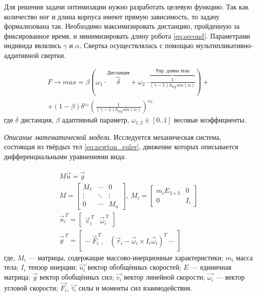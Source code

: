 Для решения задачи оптимизации нужно разработать целевую функцию. Так как количество ног и длина корпуса имеют прямую зависимость, то задачу формализована так. Необходимо максимизировать дистанцию, пройденную за фиксированное время, и минимизировать длину робота \eqref{eq:second}. Параметрами индивида являлись $\gamma$ и $\alpha$. Свертка осуществлялась с помощью мультипликативно-аддитивной свертки.

\begin{eqnarray}
    \label{eq:second}
    F \rightarrow max = \beta \left( {\omega}_{1} \cdot \overbrace{\delta}^{\text{Дистанция}} + {\omega}_{2} \cdot \overbrace{\frac{1}{(\gamma - 1) h_{\text{leg}}sin(\alpha)}}^{\text{Упр. длина тела}}\right) + \\ \nonumber + (1 - \beta) {\delta}^{{\omega}_{1}} {\left( \frac{1}{(\gamma - 1)h_{\text{leg}}sin(\alpha)}\right)}^{{\omega}_{2}}
\end{eqnarray}
где $\delta$ дистанция, $\beta$ адаптивный параметр, ${\omega}_{1,2} \in  [ 0..1 ] $ весовые коэффициенты.

\textit{Описание математической модели}. Исследуется механическая система, состоящая из твёрдых тел \eqref{eq:newton_euler}, движение которых описывается дифференциальными уравнениями вида:

\begin{align}
    \label{eq:newton_euler}
    M \dot{\vec{u}} = \vec{g} \\
    M = \begin{bmatrix}
    M_1 & \cdots  & 0 \\
    \vdots  & \ddots  & \vdots  \\ 
    0 & \cdots   & M_n 
    \end{bmatrix},\ M_i = \begin{bmatrix}
    m_i E_{3\times 3} & 0 \\ 
    0 & I_i 
    \end{bmatrix} \\
    \vec{u}_i^{\ T} = \begin{bmatrix}
        \vec{v}_i^{\ T} & \vec{\omega}_i^{\ T}
    \end{bmatrix} \\ 
    \vec{g}^{\ T} = \begin{bmatrix}
        \cdots \  \vec{F}_i^{\ T}, & (\vec{\tau}_i - \vec{\omega}_i \times I_i \vec{\omega}_i)^T\  \cdots 
    \end{bmatrix}
\end{align}
где, $M_i$ --- матрицы, содержащие массово-инерционные характеристики; $m_i$ масса тела; $I_i$ тензор инерции; $\vec{u_i}$ вектор обобщённых скоростей; $E$ --- единичная матрица; $\vec{g}$ вектор обобщённых сил; $\vec{v_i}$ вектор линейной скорости; $\vec{\omega_i}$ --- вектор угловой скорости; $\vec{F_i}$, $\vec{\tau_i}$ силы и моменты сил взаимодействия.

